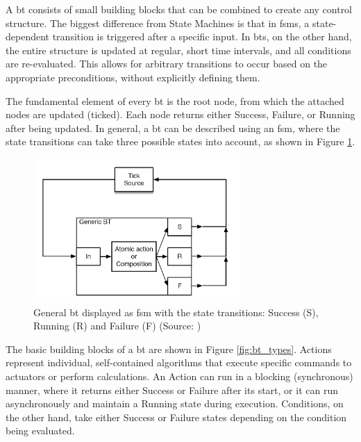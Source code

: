 A \gls{bt} consists of small building blocks that can be combined to create any control structure. The biggest difference from State Machines is that in \glspl{fsm}, a state-dependent transition is triggered after a specific input. In \glspl{bt}, on the other hand, the entire structure is updated at regular, short time intervals, and all conditions are re-evaluated. This allows for arbitrary transitions to occur based on the appropriate preconditions, without explicitly defining them.

The fundamental element of every \gls{bt} is the root node, from which the attached nodes are updated (ticked). Each node returns either Success, Failure, or Running after being updated. In general, a \gls{bt} can be described using an \gls{fsm}, where the state transitions can take three possible states into account, as shown in Figure \ref{fig:fsm_general_bt}.

\begin{figure}[h]
    \centering
    \includegraphics[width=0.7\textwidth]{figures/20_state_of_the_art/fsm_general_bt.png}
    \caption[General \gls{bt} displayed as \gls{fsm}]{General \gls{bt} displayed as \gls{fsm} with the state transitions: Success (S), Running (R) and Failure (F) (Source: \cite{colledanchise_behavior_2018})}
    \label{fig:fsm_general_bt}
\end{figure}

The basic building blocks of a \gls{bt} are shown in Figure \ref{fig:bt_types}. Actions represent individual, self-contained algorithms that execute specific commands to actuators or perform calculations. An Action can run in a blocking (synchronous) manner, where it returns either Success or Failure after its start, or it can run asynchronously and maintain a Running state during execution. Conditions, on the other hand, take either Success or Failure states depending on the condition being evaluated.


